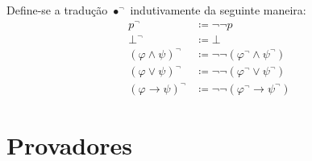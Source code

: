 \begin{definition}[$\bullet^\neg$] Define-se a tradução $\bullet^\neg$ indutivamente da seguinte maneira:
    \begin{align*}
        p^\neg                     & \coloneqq \neg\neg p                               \\
        \bot^\neg                  & \coloneqq \bot                                     \\
        {(\varphi \wedge \psi)}^\neg & \coloneqq \neg\neg (\varphi^\neg \wedge \psi^\neg) \\
        {(\varphi \vee \psi)}^\neg   & \coloneqq \neg\neg (\varphi^\neg \vee \psi^\neg)   \\
        {(\varphi \to \psi)}^\neg    & \coloneqq \neg\neg (\varphi^\neg \to \psi^\neg)
        \tag*{\qed} 
    \end{align*}
\end{definition}

\section{Provadores}
